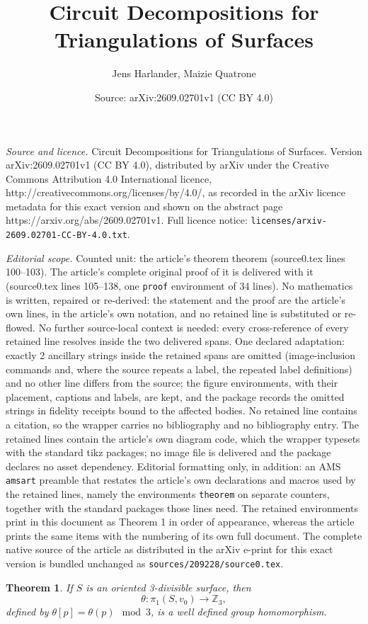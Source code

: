 \documentclass[10pt,a4paper]{amsart}
\title{Circuit Decompositions for Triangulations of Surfaces}
\author{Jens Harlander, Maizie Quatrone}
\date{Source: arXiv:2609.02701v1 (CC BY 4.0)}
\newtheorem{theorem}{Theorem}
\begin{document}
\maketitle

\noindent\emph{Source and licence.} Circuit Decompositions for Triangulations of Surfaces. Version arXiv:2609.02701v1 (CC BY 4.0), distributed by arXiv under the Creative Commons Attribution 4.0 International licence, http://creativecommons.org/licenses/by/4.0/, as recorded in the arXiv licence metadata for this exact version and shown on the abstract page https://arxiv.org/abs/2609.02701v1. Full licence notice: \texttt{licenses/arxiv-2609.02701-CC-BY-4.0.txt}.\par\smallskip

\noindent\textit{Editorial scope.} Counted unit: the article's theorem theorem (source0.tex lines 100--103). The article's complete original proof of it is delivered with it (source0.tex lines 105--138, one \texttt{proof} environment of 34 lines). No mathematics is written, repaired or re-derived: the statement and the proof are the article's own lines, in the article's own notation, and no retained line is substituted or re-flowed.  No further source-local context is needed: every cross-reference of every retained line resolves inside the two delivered spans.  One declared adaptation: exactly 2 ancillary strings inside the retained spans are omitted (image-inclusion commands and, where the source repeats a label, the repeated label definitions) and no other line differs from the source; the figure environments, with their placement, captions and labels, are kept, and the package records the omitted strings in fidelity receipts bound to the affected bodies.  No retained line contains a citation, so the wrapper carries no bibliography and no bibliography entry.  The retained lines contain the article's own diagram code, which the wrapper typesets with the standard tikz packages; no image file is delivered and the package declares no asset dependency.  Editorial formatting only, in addition: an AMS \texttt{amsart} preamble that restates the article's own declarations and macros used by the retained lines, namely the environments \texttt{theorem} on separate counters, together with the standard packages those lines need.  The retained environments print in this document as Theorem 1 in order of appearance, whereas the article prints the same items with the numbering of its own full document.  The complete native source of the article as distributed in the arXiv e-print for this exact version is bundled unchanged as \texttt{sources/209228/source0.tex}.
\begin{theorem}
    If $S$ is an oriented 3-divisible surface, then 
    $$\theta\colon \pi_1(S,v_0)\to \mathbb Z_3,$$ defined by $\theta[p]=\theta(p)\mod3$, is a well defined group homomorphism.
\end{theorem}
\end{document}
